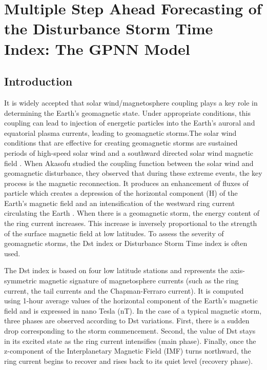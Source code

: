 \chapter{Multiple Step Ahead Forecasting of the Disturbance Storm Time Index: The GPNN Model}\label{chapter:dst_msa}

\section{Introduction}

It is widely accepted that solar wind/magnetosphere coupling plays a key role in determining the Earth’s 
geomagnetic state. Under appropriate conditions, this coupling can lead to injection of energetic particles 
into the Earth’s auroral and equatorial plasma currents, leading to geomagnetic storms.The solar wind conditions 
that are effective for creating geomagnetic storms are sustained periods of high-speed solar wind and a southward 
directed solar wind magnetic field \citet{JGR:JGR10260}. When Akasofu \citet{1981AkasofuE} studied the coupling function 
between the solar wind and geomagnetic disturbance, they observed that during these extreme events, the key process 
is the magnetic reconnection. It produces an enhancement of fluxes of particle which creates a depression of the 
horizontal component (H) of the Earth’s magnetic field and an intensification of the westward ring current 
circulating the Earth \citet{JGRA:JGRA11775}. When there is a geomagnetic storm, the energy content of the ring current 
increases. This increase is inversely proportional to the strength of the surface magnetic field at low latitudes. 
To assess the severity of geomagnetic storms, the Dst index or Disturbance Storm Time index is often used. 

The Dst index \citet{Sugiura1964} is based on four low latitude stations and represents the axis-symmetric 
magnetic signature of magnetosphere currents (such as the ring current, the tail currents and the 
Chapman-Ferraro current). It is computed using 1-hour average values of the horizontal component of the 
Earth’s magnetic field and is expressed in nano Tesla (nT). In the case of a typical magnetic storm, 
three phases are observed according to Dst variations. First, there is a sudden drop corresponding to 
the storm commencement. Second, the value of Dst stays in its excited state as the ring current intensifies 
(main phase). Finally, once the z-component of the Interplanetary Magnetic Field (IMF) turns northward, 
the ring current begins to recover and rises back to its quiet level (recovery phase). 

